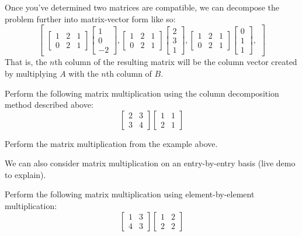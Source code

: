 \documentclass[11pt]{exam}
\begin{document}
    Once you've determined two matrices are compatible, we can decompose the problem further into matrix-vector form like so:
    $$\begin{bmatrix}
        \begin{bmatrix} 1 & 2 & 1 \\ 0 & 2 & 1 \end{bmatrix}\begin{bmatrix} 1 \\ 0 \\ -2 \end{bmatrix},
        \begin{bmatrix} 1 & 2 & 1 \\ 0 & 2 & 1 \end{bmatrix}\begin{bmatrix} 2 \\ 3 \\ 1 \end{bmatrix},
        \begin{bmatrix} 1 & 2 & 1 \\ 0 & 2 & 1 \end{bmatrix}\begin{bmatrix} 0 \\ 1 \\ 1 \end{bmatrix},
    \end{bmatrix}$$
    That is, the $n$th column of the resulting matrix will be the column vector created by multiplying $A$ with the $n$th column of $B$.

    \begin{questions}
        \item Perform the following matrix multiplication using the column decomposition method described above:
        $$\begin{bmatrix} 2 & 3 \\ 3 & 4 \end{bmatrix} \begin{bmatrix} 1 & 1 \\ 2 & 1 \end{bmatrix}$$
        \item Perform the matrix multiplication from the example above.
    \end{questions}

    We can also consider matrix multiplication on an entry-by-entry basis (live demo to explain).

    \begin{questions}
        \item Perform the following matrix multiplication using element-by-element multiplication:
        $$\begin{bmatrix} 1 & 3 \\ 4 & 3 \end{bmatrix} \begin{bmatrix} 1 & 2 \\ 2 & 2 \end{bmatrix}$$
    \end{questions}
\end{document}
